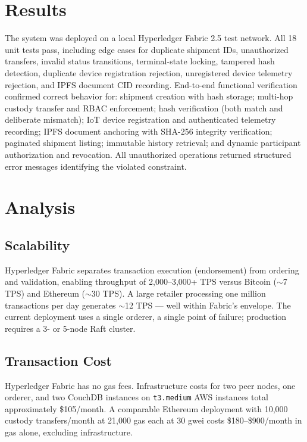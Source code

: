 \documentclass[conference]{IEEEtran}
\begin{document}
\section{Results}

The system was deployed on a local Hyperledger Fabric 2.5 test network.
All 18 unit tests pass, including edge cases for duplicate shipment IDs,
unauthorized transfers, invalid status transitions, terminal-state locking,
tampered hash detection, duplicate device registration rejection,
unregistered device telemetry rejection, and IPFS document CID recording.
End-to-end functional verification confirmed correct behavior for: shipment
creation with hash storage; multi-hop custody transfer and RBAC enforcement;
hash verification (both match and deliberate mismatch); IoT device
registration and authenticated telemetry recording; IPFS document anchoring
with SHA-256 integrity verification; paginated shipment listing; immutable
history retrieval; and dynamic participant authorization and revocation.
All unauthorized operations returned structured error messages identifying
the violated constraint.

\section{Analysis}

\subsection{Scalability}

Hyperledger Fabric separates transaction execution (endorsement) from
ordering and validation, enabling throughput of 2,000--3,000+ TPS
\cite{fabricdocs} versus Bitcoin ($\sim$7 TPS) and Ethereum ($\sim$30 TPS).
A large retailer processing one million transactions per day generates
$\sim$12 TPS --- well within Fabric's envelope.  The current deployment uses
a single orderer, a single point of failure; production requires a 3- or
5-node Raft cluster.

\subsection{Transaction Cost}

Hyperledger Fabric has no gas fees.  Infrastructure costs for two peer
nodes, one orderer, and two CouchDB instances on \texttt{t3.medium} AWS
instances total approximately \$105/month.  A comparable Ethereum deployment
with 10,000 custody transfers/month at 21,000 gas each at 30 gwei costs
\$180--\$900/month in gas alone, excluding infrastructure.
\end{document}
